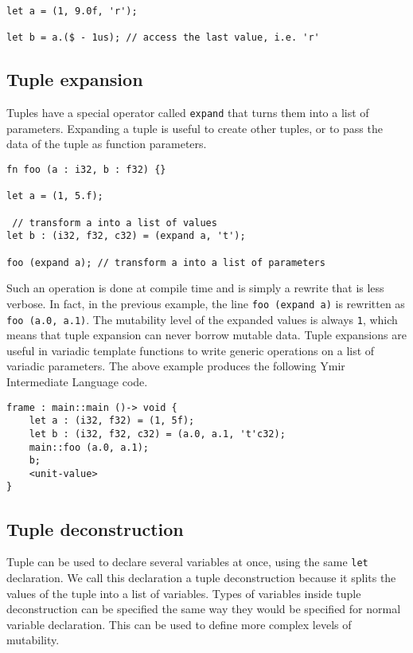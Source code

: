 \begin{lstlisting}[style=coloredverbatim]
let a = (1, 9.0f, 'r');

let b = a.($ - 1us); // access the last value, i.e. 'r'
\end{lstlisting}

\subsection {Tuple expansion}

Tuples have a special operator called \texttt{expand} that turns them into a
list of parameters. Expanding a tuple is useful to create other tuples, or to
pass the data of the tuple as function parameters.

\begin{lstlisting}[style=coloredverbatim]
fn foo (a : i32, b : f32) {}

let a = (1, 5.f);

 // transform a into a list of values
let b : (i32, f32, c32) = (expand a, 't');

foo (expand a); // transform a into a list of parameters
\end{lstlisting}

Such an operation is done at compile time and is simply a rewrite that is less
verbose. In fact, in the previous example, the line \texttt{foo (expand a)} is
rewritten as \texttt{foo (a.0, a.1)}. The mutability level of the expanded
values is always \texttt{1}, which means that tuple expansion can never borrow
mutable data. Tuple expansions are useful in variadic template functions to
write generic operations on a list of variadic parameters. The above example produces the following Ymir Intermediate Language code.

\begin{lstlisting}[style=intermediateVerb]
frame : main::main ()-> void {
    let a : (i32, f32) = (1, 5f);
    let b : (i32, f32, c32) = (a.0, a.1, 't'c32);
    main::foo (a.0, a.1);
    b;
    <unit-value>
}
\end{lstlisting}

\subsection {Tuple deconstruction}

Tuple can be used to declare several variables at once, using the same
\texttt{let} declaration. We call this declaration a tuple deconstruction
because it splits the values of the tuple into a list of variables. Types of
variables inside tuple deconstruction can be specified the same way they would
be specified for normal variable declaration. This can be used to define more
complex levels of mutability.

